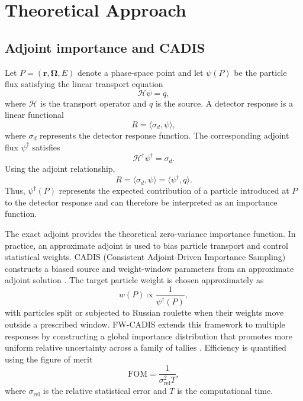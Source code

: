 \documentclass[a4paper,fleqn]{cas-sc}
\let\Oldsubsection\subsection
\renewcommand{\subsection}{\FloatBarrier\Oldsubsection}
\begin{document}
	\FloatBarrier
	
	
	
	\section{Theoretical Approach}\label{sec:methods}
	
	\subsection{Adjoint importance and CADIS}\label{sec:theory}
	
	Let $P=(\mathbf r,\mathbf\Omega,E)$ denote a phase-space point and let $\psi(P)$ be the particle flux satisfying the linear transport equation
	\begin{equation}
		\mathcal{H}\psi=q,
	\end{equation}
	where $\mathcal{H}$ is the transport operator and $q$ is the source. A detector response is a linear functional
	\begin{equation}
		R=\langle \sigma_d,\psi\rangle ,
	\end{equation}
	where $\sigma_d$ represents the detector response function. The corresponding adjoint flux $\psi^\dagger$ satisfies
	\begin{equation}
		\mathcal{H}^{\dagger}\psi^\dagger=\sigma_d .
		\label{eq:adjoint}
	\end{equation}
	Using the adjoint relationship,
	\begin{equation}
		R=\langle \sigma_d,\psi\rangle
		=\langle \psi^\dagger,q\rangle .
		\label{eq:fund}
	\end{equation}
	Thus, $\psi^\dagger(P)$ represents the expected contribution of a particle introduced at $P$ to the detector response and can therefore be interpreted as an importance function.
	
	The exact adjoint provides the theoretical zero-variance importance function. In practice, an approximate adjoint is used to bias particle transport and control statistical weights. CADIS (Consistent Adjoint-Driven Importance Sampling) constructs a biased source and weight-window parameters from an approximate adjoint solution \cite{wagner1998,haghighat2003}. The target particle weight is chosen approximately as
	\begin{equation}
		w(P)\propto \frac{1}{\psi^\dagger(P)},
	\end{equation}
	with particles split or subjected to Russian roulette when their weights move outside a prescribed window. FW-CADIS extends this framework to multiple responses by constructing a global importance distribution that promotes more uniform relative uncertainty across a family of tallies \cite{wagnerfw2014,cooper2001}. Efficiency is quantified using the figure of merit
	\begin{equation}
		\mathrm{FOM}=\frac{1}{\sigma_{\mathrm{rel}}^2T},
		\label{eq:fom}
	\end{equation}
	where $\sigma_{\mathrm{rel}}$ is the relative statistical error and $T$ is the computational time.
	
\end{document}
